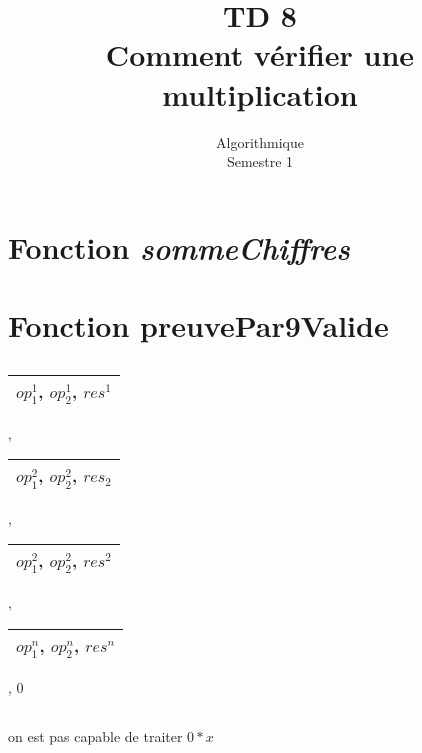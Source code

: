 \documentclass{article}
\title{TD 8\\ Comment vérifier une multiplication}
\date{Algorithmique\\ Semestre 1}
\begin{document}
	\maketitle
	\section{Fonction \textit{sommeChiffres}}
		\subsection{}
				
		\subsection{}
			
		\subsection{}
			
	\section{Fonction preuvePar9Valide}
		\subsection{}
			\begin{tabular}{|c|}
				\hline
					$op^{1}_{1}$, $op^{1}_{2}$, $res^{1}$\\
				\hline
			\end{tabular} ,
			\begin{tabular}{|c|}
				\hline
					$op^{2}_{1}$, $op^{2}_{2}$, $res_{2}$\\
				\hline
			\end{tabular} ,
			\begin{tabular}{|c|}
				\hline
					$op^{2}_{1}$, $op^{2}_{2}$, $res^{2}$\\
				\hline
			\end{tabular} ,
			\begin{tabular}{|c|}
				\hline
					$op^{n}_{1}$, $op^{n}_{2}$, $res^{n}$\\
				\hline
			\end{tabular} , 0
		\subsection{}
			on est pas capable de traiter $0 * x$
\end{document}
